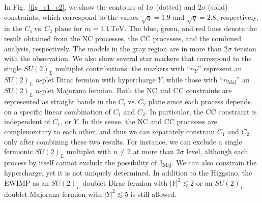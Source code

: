 \documentclass[12pt, a4paper]{article}
\begin{document}
In Fig.~\ref{fig_c1_c2}, we show the contours of $1\sigma$ (dotted)
and $2\sigma$ (solid) constraints, which correspond to the values
$\sqrt{q}=1.9$ and $\sqrt{q}=2.8$, respectively, in the
$C_1~\mathrm{vs.}~C_2$ plane for $m=1.1\,\mathrm{TeV}$.  The blue,
green, and red lines denote the result obtained from the NC processes,
the CC processes, and the combined analysis, respectively.  The models
in the gray region are in more than $2\sigma$ tension with the
observation.  We also show several star markers that correspond to the
single $SU(2)_L$ multiplet contributions: the markers with ``$n_Y$''
represent an $SU(2)_L$ $n$-plet Dirac fermion with hypercharge $Y$,
while those with ``$n_\mathrm{Maj}$'' an $SU(2)_L$ $n$-plet Majorana
fermion.
Both the NC and CC constraints are represented
as straight bands in the $C_1~\mathrm{vs.}~C_2$ plane
since each process depends on a specific linear combination of $C_1$ and $C_2$.
In particular, the CC constraint is independent of $C_1$, or $Y$.
In this sense, the NC and CC processes are complementary to each other,
and thus we can separately constrain $C_1$ and $C_2$ only after
combining these two results.
For instance, we can exclude a single fermionic $SU(2)_L$ multiplet with $n \neq 2$ at more than
$2\sigma$ level, although
each process by itself cannot exclude the
possibility of $3_{\text{Maj}}$.
We can also constrain the hypercharge, yet it is not uniquely determined.
In addition to the Higgsino,
the EWIMP as an $SU(2)_L$ doublet Dirac fermion with
$|Y|^2\lesssim 2$ or an $SU(2)_L$ doublet Majorana fermion with
$|Y|^2\lesssim 5$ is still allowed.
\end{document}
